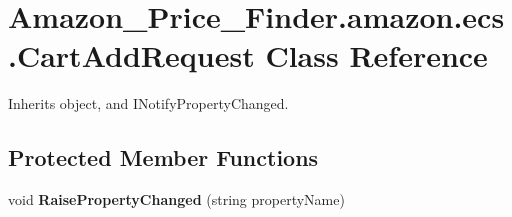 \hypertarget{class_amazon___price___finder_1_1amazon_1_1ecs_1_1_cart_add_request}{\section{Amazon\-\_\-\-Price\-\_\-\-Finder.\-amazon.\-ecs.\-Cart\-Add\-Request Class Reference}
\label{class_amazon___price___finder_1_1amazon_1_1ecs_1_1_cart_add_request}
}


 




Inherits object, and I\-Notify\-Property\-Changed.

\subsection*{Protected Member Functions}
\begin{DoxyCompactItemize}
\item 
\hypertarget{class_amazon___price___finder_1_1amazon_1_1ecs_1_1_cart_add_request_a3f50985acb4df857604eebe4d2702384}{void {\bfseries Raise\-Property\-Changed} (string property\-Name)}\label{class_amazon___price___finder_1_1amazon_1_1ecs_1_1_cart_add_request_a3f50985acb4df857604eebe4d2702384}

\end{DoxyCompactItemize}
